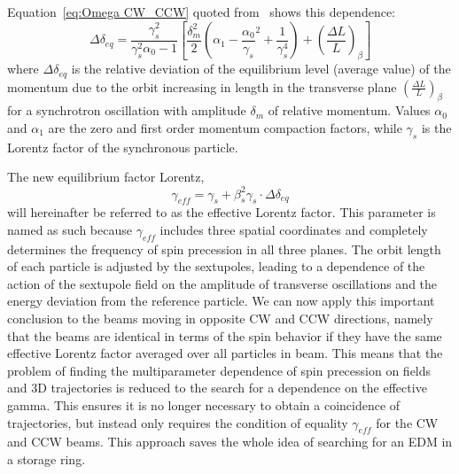\documentclass[a4paper]{jacow}
\begin{document}
 Equation~\eqref{eq:Omega CW_CCW} quoted from~\cite{IPAC2013} shows this dependence:
\begin{equation}\label{eq:delta p}
\Delta\delta_{eq}=\frac{\gamma_{s}^{2}}{\gamma_{s}^{2}\alpha_0-1}\left[\frac{\delta_{m}^{2}}{2}\left(\alpha_{1}-\frac{\alpha_{0}}{\gamma_{s}}^{2}+\frac{1}{\gamma_{s}^{4}}\right)+\left(\frac{\Delta L}{L}\right)_{\beta}\right]	
	\end{equation}
where $\Delta\delta_{eq}$  is the relative deviation of the equilibrium level (average value) of the momentum due to the orbit increasing in length in the transverse plane $\left(\frac{\Delta L}{L}\right)_{\beta}$   for a synchrotron oscillation with amplitude $\delta_{m}$ of relative momentum. Values $\alpha_{0}$ and $\alpha_{1}$  are the zero and first order momentum compaction factors, while $\gamma_{s}$  is the Lorentz factor of the synchronous particle. 

The new equilibrium factor Lorentz,
\begin{equation}\label{eq:effec gamma}
\gamma_{eff}=\gamma_{s}+\beta_s^{2} \gamma_s\cdot\Delta\delta_{eq}	
\end{equation}
will hereinafter be referred to as the effective Lorentz factor. This parameter is named as such because $\gamma_{eff}$ includes three spatial coordinates and completely determines the frequency of spin precession in all three planes. The orbit length of each particle is adjusted by the sextupoles, leading to a dependence of the action of the sextupole field on the amplitude of transverse oscillations and the energy deviation from the reference particle. We can now apply this important conclusion to the beams moving in opposite CW and CCW directions, namely that the beams are identical in terms of the spin behavior if they have the same effective Lorentz factor averaged over all particles in beam. This means that the problem of finding the multiparameter dependence of spin precession on fields and 3D trajectories is reduced to the search for a dependence on the effective gamma. This ensures it is no longer necessary to obtain a coincidence of trajectories, but instead only requires the condition of equality $\gamma_{eff}$   for the CW and CCW beams. This approach saves the whole idea of searching for an EDM in a storage ring.
\end{document}
